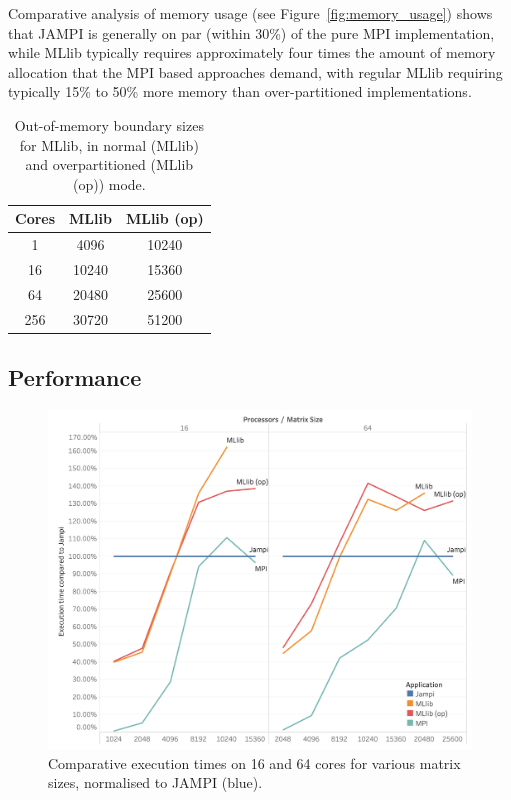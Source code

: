 \documentclass[fleqn,10pt]{SelfArx} %
\begin{document}
Comparative analysis of memory usage (see Figure~\ref{fig:memory_usage}) shows that JAMPI is generally on par (within 30\%) of the pure MPI implementation, while MLlib typically requires approximately four times the amount of memory allocation that the MPI based approaches demand, with regular MLlib requiring typically 15\% to 50\% more memory than over-partitioned implementations.

\begin{table}
	\centering
	\begin{tabular}{ |c|c|c| } 
	 \hline
	 Cores & MLlib & MLlib (op)  \\ 
	 \hline\hline
	 1 & 4096 & 10240 \\ 
	 \hline
	 16 & 10240 & 15360 \\ 
	 \hline
	 64 & 20480 & 25600 \\ 
	 \hline
	 256 & 30720 & 51200 \\ 
	 \hline
	\end{tabular}
	\caption{Out-of-memory boundary sizes for MLlib, in normal (MLlib) and overpartitioned (MLlib (op)) mode.}
	\label{tab:out_of_memory}
\end{table}
	

\subsection{Performance} %
\label{sub:performance}


\begin{figure}
	\centering
	\includegraphics[width=0.9\linewidth]{compared_to_jampi}
	\vspace{14pt}
	\caption{Comparative execution times on 16 and 64 cores for various matrix sizes, normalised to JAMPI (blue).}
	\label{fig:comparison_to_jampi}
\end{figure}
\end{document}
